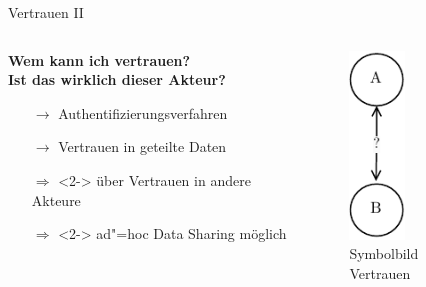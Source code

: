 \begin{frame}{Vertrauen II}
    \begin{columns}
        \begin{column}{0.6\textwidth}
            \textbf{Wem kann ich vertrauen?\\Ist das wirklich dieser Akteur?}
            \begin{itemize}
                \item[$\to$] Authentifizierungsverfahren
                \item[$\to$] Vertrauen in geteilte Daten
                
        
                \item[$\Rightarrow$]<2-> über Vertrauen in andere Akteure
                \item[$\Rightarrow$]<2-> ad"=hoc Data Sharing möglich
            \end{itemize}
        \end{column}

        \begin{column}{0.4\textwidth}
            \begin{figure}
                \centering
                \includegraphics[height=5cm]{./assets/trust_question.drawio.pdf}
                \caption{Symbolbild Vertrauen}
            \end{figure}
        \end{column}
    \end{columns}
\end{frame}


